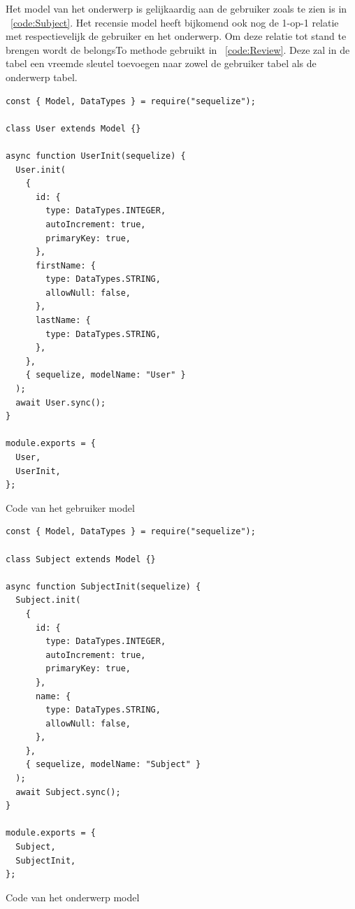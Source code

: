 Het model van het onderwerp is gelijkaardig aan de gebruiker zoals te zien is in ~\ref{code:Subject}. Het recensie model heeft bijkomend 
ook nog de 1-op-1 relatie met respectievelijk de gebruiker en het onderwerp.
Om deze relatie tot stand te brengen wordt de belongsTo methode gebruikt in ~\ref{code:Review}. 
Deze zal in de tabel een vreemde sleutel toevoegen naar zowel de gebruiker tabel als de onderwerp tabel. 
\begin{listing}[H]
  \centering
  \begin{verbatim}
const { Model, DataTypes } = require("sequelize");

class User extends Model {}

async function UserInit(sequelize) {
  User.init(
    {
      id: {
        type: DataTypes.INTEGER,
        autoIncrement: true,
        primaryKey: true,
      },
      firstName: {
        type: DataTypes.STRING,
        allowNull: false,
      },
      lastName: {
        type: DataTypes.STRING,
      },
    },
    { sequelize, modelName: "User" }
  );
  await User.sync();
}

module.exports = {
  User,
  UserInit,
};
\end{verbatim}
\caption{\label{code:User}Code van het gebruiker model}
\end{listing}

\begin{listing}[H]
  \centering
  \begin{verbatim}
const { Model, DataTypes } = require("sequelize");

class Subject extends Model {}

async function SubjectInit(sequelize) {
  Subject.init(
    {
      id: {
        type: DataTypes.INTEGER,
        autoIncrement: true,
        primaryKey: true,
      },
      name: {
        type: DataTypes.STRING,
        allowNull: false,
      },
    },
    { sequelize, modelName: "Subject" }
  );
  await Subject.sync();
}

module.exports = {
  Subject,
  SubjectInit,
};
\end{verbatim}
\caption{\label{code:Subject}Code van het onderwerp model}
\end{listing}

